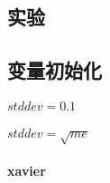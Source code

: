 \begin{spacing}{2}
    \section{实验}
\end{spacing}
\subsection{变量初始化}
\paragraph{$stddev=0.1$}
\paragraph{$stddev=\sqrt{me}$}
\paragraph{xavier}